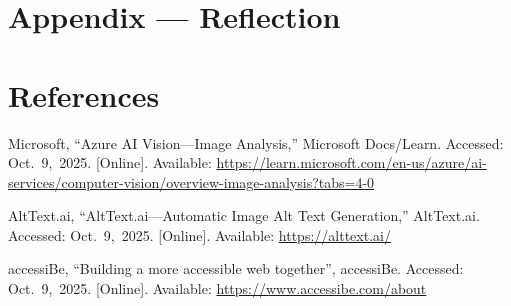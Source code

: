 \documentclass[12pt]{article}
\begin{document}
\section*{Appendix --- Reflection}





\newpage
\section*{References} 

\begin{hangparas}{2em}{1}
Microsoft, ``Azure AI Vision---Image Analysis,'' Microsoft Docs/Learn.
Accessed: Oct.~9,~2025. [Online]. Available:
\url{https://learn.microsoft.com/en-us/azure/ai-services/computer-vision/overview-image-analysis?tabs=4-0}
\\
\par
AltText.ai, ``AltText.ai---Automatic Image Alt Text Generation,'' AltText.ai.
Accessed: Oct.~9,~2025. [Online]. Available: \url{https://alttext.ai/}
\\
\par
accessiBe, ``Building a more accessible web together'', accessiBe.
Accessed: Oct.~9,~2025. [Online]. Available:
\url{https://www.accessibe.com/about}
\end{hangparas}
\end{document}
